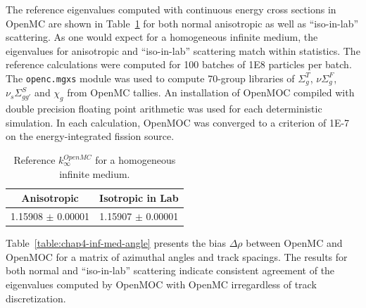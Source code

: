 The reference eigenvalues computed with continuous energy cross sections in OpenMC are shown in Table~\ref{table:chap4-inf-med-reference} for both normal anisotropic as well as ``iso-in-lab'' scattering. As one would expect for a homogeneous infinite medium, the eigenvalues for anisotropic and ``iso-in-lab'' scattering match within statistics.  The reference calculations were computed for 100 batches of 1E8 particles per batch. The \texttt{openc.mgxs} module was used to compute 70-group libraries of $\Sigma^T_g$, $\nu\Sigma^F_g$, $\nu_s\Sigma^S_{gg'}$ and $\chi_g$ from OpenMC tallies. An installation of OpenMOC compiled with double precision floating point arithmetic was used for each deterministic simulation. In each calculation, OpenMOC was converged to a criterion of 1E-7 on the energy-integrated fission source.

\begin{table}[h!]
  \centering
  \caption{Reference $k^{OpenMC}_{\infty}$ for a homogeneous infinite medium.}
  \small
  \label{table:chap4-inf-med-reference} 
  \vspace{6pt}
  \begin{tabular}{c c}
  \toprule
  \multicolumn{1}{c}{\bf Anisotropic} &
  \multicolumn{1}{c}{\bf Isotropic in Lab} \\
  \midrule
  1.15908 $\pm$ 0.00001 & 1.15907 $\pm$ 0.00001 \\
  \bottomrule
\end{tabular}
\end{table}

Table~\ref{table:chap4-inf-med-angle} presents the bias $\Delta\rho$ between OpenMC and OpenMOC for a matrix of azimuthal angles and track spacings. The results for both normal and ``iso-in-lab'' scattering indicate consistent agreement of the eigenvalues computed by OpenMOC with OpenMC irregardless of track discretization.

